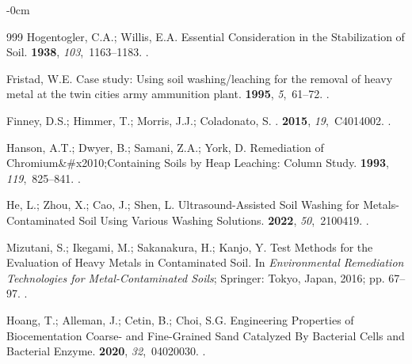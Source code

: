 \documentclass[algorithms,article,accept,pdftex,moreauthors]{Definitions/mdpi}
\begin{document}
\begin{adjustwidth}{-\extralength}{0cm}
\begin{thebibliography}{999}
Hogentogler, C.A.; Willis, E.A.
\newblock Essential Consideration in the Stabilization of Soil.
 {\bf
  1938}, {\em 103},~1163--1183.
.

Fristad, W.E.
\newblock Case study: Using soil washing/leaching for the removal of heavy
  metal at the twin cities army ammunition plant.
 {\bf 1995}, {\em 5},~61--72.
.

Finney, D.S.; Himmer, T.; Morris, J.J.; Coladonato, S.
.
 {\bf 2015},
  {\em 19},~C4014002.
.

Hanson, A.T.; Dwyer, B.; Samani, Z.A.; York, D.
\newblock Remediation of Chromium\&\#x2010;Containing Soils by Heap Leaching:
  Column Study.
 {\bf 1993}, {\em
  119},~825--841.
.

He, L.; Zhou, X.; Cao, J.; Shen, L.
\newblock Ultrasound-Assisted Soil Washing for Metals-Contaminated Soil Using
  Various Washing Solutions.
 {\bf 2022}, {\em 50},~2100419.
.

Mizutani, S.; Ikegami, M.; Sakanakura, H.; Kanjo, Y. Test Methods for the
  Evaluation of Heavy Metals in Contaminated Soil.
\newblock In {\em Environmental Remediation Technologies for Metal-Contaminated
  Soils}; Springer: Tokyo, Japan, 2016; pp. 67--97.
.

Hoang, T.; Alleman, J.; Cetin, B.; Choi, S.G.
\newblock Engineering Properties of Biocementation Coarse- and Fine-Grained
  Sand Catalyzed By Bacterial Cells and Bacterial Enzyme.
 {\bf 2020}, {\em
  32},~04020030.
.


\end{thebibliography}
\end{adjustwidth}
\end{document}

